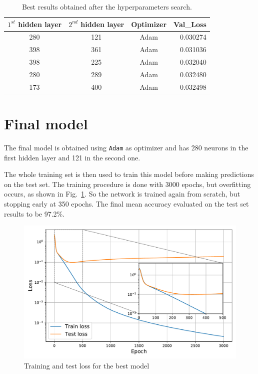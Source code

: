 \documentclass[a4paper,11pt]{article}
\begin{document}
\begin{table}[hp]
    \centering
    \caption{Best results obtained after the hyperparameters search.}
    \label{tab:ParamSearch}
    \begin{tabular}{cccr}
        \toprule
         $1^{st}$ hidden layer &  $2^{nd}$ hidden layer & Optimizer &   Val\_Loss \\
        \midrule
         280 &  121 &      Adam &   0.030274 \\
         398 &  361 &      Adam &   0.031036 \\
         398 &  225 &      Adam &   0.032040 \\
         280 &  289 &      Adam &   0.032480 \\
         173 &  400 &      Adam &   0.032498 \\
         \bottomrule
    \end{tabular}
\end{table}

\section{Final model}
The final model is obtained using \texttt{Adam} as optimizer and has 280 neurons in the first hidden layer and 121 in the second one.

The whole training set is then used to train this model before making predictions on the test set. The training procedure is done with 3000 epochs, but overfitting occurs, as shown in Fig.~\ref{fig:loss}. So the network is trained again from scratch, but stopping early at 350 epochs. The final mean accuracy evaluated on the test set results to be 97.2\%.

\begin{figure}[hp]
    \centering
    \caption{Training and test loss for the best model}
    \label{fig:loss}
    \includegraphics[width=.75\linewidth]{../Figure/Loss.pdf}
\end{figure}
\end{document}
